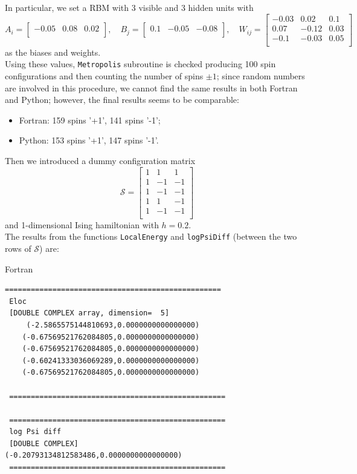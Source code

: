 \documentclass[a4paper,11pt]{article}
\begin{document}
In particular, we set a RBM with 3 visible and 3 hidden units with
\[
    A_i = 
    \begin{bmatrix}
    -0.05 & 0.08 & 0.02 \\
    \end{bmatrix}, \quad
    B_j =
    \begin{bmatrix}
    0.1 & -0.05 & -0.08 \\
    \end{bmatrix}, \quad
    W_{ij} =
    \begin{bmatrix}
    -0.03 &  0.02 & 0.1 \\
     0.07 & -0.12 & 0.03 \\
    -0.1  & -0.03 & 0.05 \\
    \end{bmatrix}
\]
as the biases and weights. \\
Using these values, \texttt{Metropolis} subroutine is checked producing 100 spin configurations and then counting the number of spins $\pm 1$; since random numbers are involved in this procedure, we cannot find the same results in both Fortran and Python; however, the final results seems to be comparable:
\begin{itemize}
    \item Fortran: 159 spins '+1', 141 spins '-1';
    \item Python: 153 spins '+1', 147 spins '-1'.
\end{itemize}

Then we introduced a dummy configuration matrix
\[
    \mathcal{S} =
    \begin{bmatrix}
    1 &  1 &  1 \\
    1 & -1 & -1 \\
    1 & -1 & -1 \\
    1 &  1 & -1 \\
    1 & -1 & -1 \\
    \end{bmatrix}
\]
and 1-dimensional Ising hamiltonian with $h=0.2$. \\
The results from the functions \texttt{LocalEnergy} and \texttt{logPsiDiff} (between the two rows of $\mathcal{S}$) are:
\begin{description}
    \item[Fortran]
\end{description}
\begin{lstlisting}[numbers=none]
 ==================================================
 Eloc
 [DOUBLE COMPLEX array, dimension=  5]
     (-2.5865575144810693,0.0000000000000000)
    (-0.67569521762084805,0.0000000000000000)
    (-0.67569521762084805,0.0000000000000000)
    (-0.60241333036069289,0.0000000000000000)
    (-0.67569521762084805,0.0000000000000000)

 ==================================================

 ==================================================
 log Psi diff
 [DOUBLE COMPLEX]             (-0.20793134812583486,0.0000000000000000)
 ==================================================
\end{lstlisting}
\end{document}
